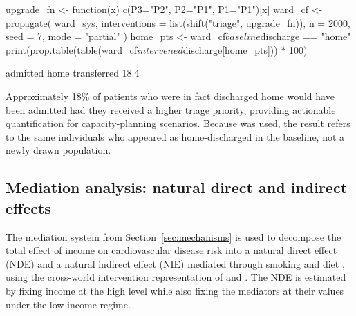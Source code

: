 \documentclass[article]{jss}
\begin{document}
\begin{CodeInput}
upgrade_fn <- function(x) c(P3="P2", P2="P1", P1="P1")[x]
ward_cf    <- propagate(
  ward_sys,
  interventions = list(shift("triage", upgrade_fn)),
  n = 2000, seed = 7, mode = "partial"
)
home_pts <- ward_cf$baseline$discharge == "home"
print(prop.table(table(ward_cf$intervened$discharge[home_pts])) * 100)
\end{CodeInput}

\begin{CodeOutput}
   admitted      home transferred
      18.4%
\end{CodeOutput}

\noindent
Approximately 18\% of patients who were in fact discharged home would have been
admitted had they received a higher triage priority, providing actionable
quantification for capacity-planning scenarios. Because 
was used, the result refers to the same individuals who appeared as home-discharged
in the baseline, not a newly drawn population.

\subsection{Mediation analysis: natural direct and indirect effects}

The mediation system from Section~\ref{sec:mechanisms} is used to decompose the
total effect of income on cardiovascular disease risk into a natural direct effect
(NDE) and a natural indirect effect (NIE) mediated through smoking and diet
\citep{imai2010identification, imai2013identification}, using the cross-world
intervention representation of \citet{robins1992identifiability} and
\citet{pearl2001direct}. The NDE is estimated by fixing income at the high
level while also fixing the mediators at their values under the low-income regime.

\end{document}
